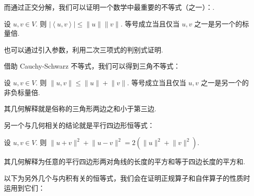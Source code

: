 而通过正交分解，我们可以证明一个数学中最重要的不等式（之一）：.

\begin{theorem} 
    设 $u, v \in V$. 则 $\left\lvert \left\langle u, v\right\rangle \right\rvert \leqslant \lVert u \rVert\lVert v \rVert$. 等号成立当且仅当 $u, v$ 之一是另一个的标量倍.
\end{theorem}

也可以通过引入参数，利用二次三项式的判别式证明.

借助 Cauchy-Schwarz 不等式，我们可以得到三角不等式：

\begin{theorem}
    设 $u, v \in V$. 则 $\lVert u, v \rVert \leqslant \lVert u \rVert + \lVert v \rVert$. 等号成立当且仅当 $u, v$ 之一是另一个的非负标量倍.
\end{theorem}

其几何解释就是俗称的三角形两边之和小于第三边.

另一个与几何相关的结论就是平行四边形恒等式：

\begin{theorem}
    设 $u, v \in V$. 则 $ \lVert u + v \rVert^{2} + \lVert u - v \rVert^{2} = 2(\lVert u \rVert^{2} + \lVert v \rVert^{2})$.
\end{theorem}

其几何解释为任意的平行四边形两对角线的长度的平方和等于四边长度的平方和.

以下为另外几个与内积有关的恒等式，我们会在证明正规算子和自伴算子的性质时运用到它们：

